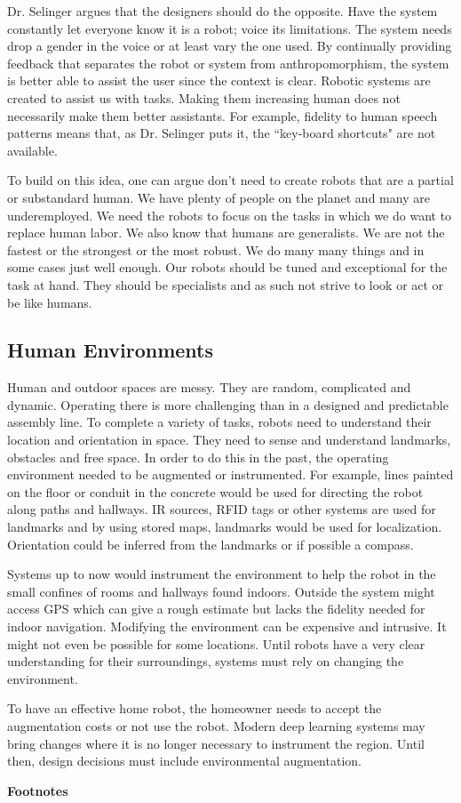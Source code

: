 Dr. Selinger argues that the designers should do the opposite. Have the
system constantly let everyone know it is a robot; voice its
limitations. The system needs drop a gender in the voice or at least
vary the one used. By continually providing feedback that separates the
robot or system from anthropomorphism, the system is better able to
assist the user since the context is clear. Robotic systems are created
to assist us with tasks. Making them increasing human does not
necessarily make them better assistants. For example, fidelity to human
speech patterns means that, as Dr. Selinger puts it, the ``key-board
shortcuts" are not available.

To build on this idea, one can argue don't need to create robots that
are a partial or substandard human. We have plenty of people on the
planet and many are underemployed. We need the robots to focus on the
tasks in which we do want to replace human labor. We also know that
humans are generalists. We are not the fastest or the strongest or the
most robust. We do many many things and in some cases just well enough.
Our robots should be tuned and exceptional for the task at hand. They
should be specialists and as such not strive to look or act or be like
humans.

\hypertarget{human-environments}{%
\subsection{Human Environments}\label{human-environments}}

Human and outdoor spaces are messy. They are random, complicated and
dynamic. Operating there is more challenging than in a designed and
predictable assembly line. To complete a variety of tasks, robots need
to understand their location and orientation in space. They need to
sense and understand landmarks, obstacles and free space. In order to do
this in the past, the operating environment needed to be augmented or
instrumented. For example, lines painted on the floor or conduit in the
concrete would be used for directing the robot along paths and hallways.
IR sources, RFID tags or other systems are used for landmarks and by
using stored maps, landmarks would be used for localization. Orientation
could be inferred from the landmarks or if possible a compass.

Systems up to now would instrument the environment to help the robot in
the small confines of rooms and hallways found indoors. Outside the
system might access GPS which can give a rough estimate but lacks the
fidelity needed for indoor navigation. Modifying the environment can be
expensive and intrusive. It might not even be possible for some
locations. Until robots have a very clear understanding for their
surroundings, systems must rely on changing the environment.

To have an effective home robot, the homeowner needs to accept the
augmentation costs or not use the robot. Modern deep learning systems
may bring changes where it is no longer necessary to instrument the
region. Until then, design decisions must include environmental
augmentation.

\textbf{Footnotes}
